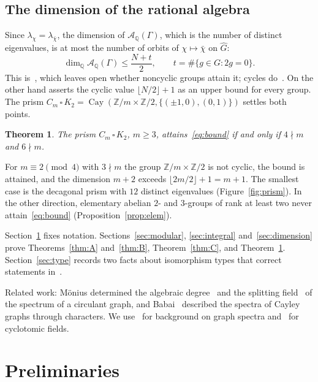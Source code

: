 \documentclass[11pt]{amsart}
\newtheorem{thmx}{Theorem}
\theoremstyle{definition}
\theoremstyle{remark}
\numberwithin{equation}{section}
\newcommand{\Q}{\mathbb{Q}}
\newcommand{\Z}{\mathbb{Z}}
\newcommand{\cA}{\mathcal{A}}
\newcommand{\Cay}{\operatorname{Cay}}
\begin{document}
\subsection*{The dimension of the rational algebra} Since $\lambda_\chi=\lambda_{\bar\chi}$, the dimension of $\cA_\Q(\Gamma)$, which is the number of distinct eigenvalues, is at most the number of orbits of $\chi\mapsto\bar\chi$ on $\widehat G$:
\begin{equation}\label{eq:bound}
\dim_\Q\cA_\Q(\Gamma)\le\frac{N+t}{2},\qquad t=\#\{g\in G:2g=0\}.
\end{equation}
This is~\cite[Remark~21.4]{BMB}, which leaves open whether noncyclic groups attain it; cycles do~\cite[Theorem~21.3]{BMB}. On the other hand \cite[Remark~19.4]{BMB} asserts the cyclic value $\lfloor N/2\rfloor+1$ as an upper bound for every group. The prism $C_m\,\square\,K_2=\Cay(\Z/m\times\Z/2,\{(\pm1,0),(0,1)\})$ settles both points.

\begin{thmx}\label{thm:D}
The prism $C_m\,\square\,K_2$, $m\ge3$, attains~\eqref{eq:bound} if and only if $4\nmid m$ and $6\nmid m$.
\end{thmx}

For $m\equiv2\pmod4$ with $3\nmid m$ the group $\Z/m\times\Z/2$ is not cyclic, the bound is attained, and the dimension $m+2$ exceeds $\lfloor 2m/2\rfloor+1=m+1$. The smallest case is the decagonal prism with $12$ distinct eigenvalues (Figure~\ref{fig:prism}). In the other direction, elementary abelian $2$- and $3$-groups of rank at least two never attain~\eqref{eq:bound} (Proposition~\ref{prop:elem}).

Section~\ref{sec:prelim} fixes notation. Sections~\ref{sec:modular}, \ref{sec:integral} and~\ref{sec:dimension} prove Theorems~\ref{thm:A} and~\ref{thm:B}, Theorem~\ref{thm:C}, and Theorem~\ref{thm:D}. Section~\ref{sec:type} records two facts about isomorphism types that correct statements in~\cite{BMB}.

Related work: Mönius determined the algebraic degree~\cite{Mo1} and the splitting field~\cite{Mo2} of the spectrum of a circulant graph, and Babai~\cite{Ba} described the spectra of Cayley graphs through characters. We use~\cite{BH} for background on graph spectra and~\cite{Wa} for cyclotomic fields.

\section{Preliminaries}\label{sec:prelim}
\end{document}
